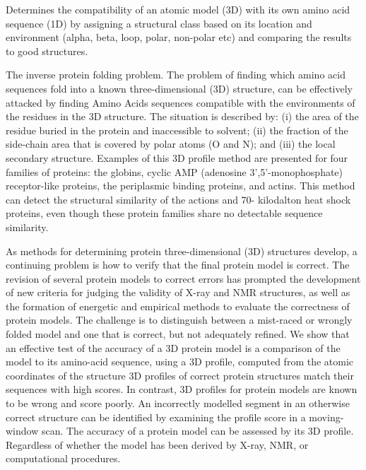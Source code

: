 \documentclass[11pt, letterpaper, english]{article}
\begin{document}
    \par{Determines the compatibility of an atomic model (3D) with its own amino acid sequence (1D) by assigning a structural class based on its location and environment (alpha, beta, loop, polar, non-polar etc) and comparing the results to good structures.}
    
    \par{The inverse protein folding problem. The problem of finding which amino acid sequences fold into a known three-dimensional (3D) structure, can be effectively attacked by finding Amino Acids sequences compatible with the environments of the residues in the 3D structure. The situation is described by: 
(i) the area of the residue buried in the protein and inaccessible to solvent; 
(ii) the fraction of the side-chain area that is covered by polar atoms (O and N); and 
(iii) the local secondary structure. 
Examples of this 3D profile method are presented for four families of proteins: the globins, cyclic AMP (adenosine 3',5'-monophosphate) receptor-like proteins, the periplasmic binding proteins, and actins. This method can detect the structural similarity of the actions and 70- kilodalton heat shock proteins, even though these protein families share no detectable sequence similarity.}

    \par{As methods for determining protein three-dimensional (3D) structures develop, a continuing problem is how to verify that the final protein model is correct. The revision of several protein models to correct errors has prompted the development of new criteria for judging the validity of X-ray and NMR structures, as well as the formation of energetic and empirical methods to evaluate the correctness of protein models. The challenge is to distinguish between a mist-raced or wrongly folded model and one that is correct, but not adequately refined. We show that an effective test of the accuracy of a 3D protein model is a comparison of the model to its amino-acid sequence, using a 3D profile, computed from the atomic coordinates of the structure 3D profiles of correct protein structures match their sequences with high scores. In contrast, 3D profiles for protein models are known to be wrong and score poorly. An incorrectly modelled segment in an otherwise correct structure can be identified by examining the profile score in a moving-window scan. The accuracy of a protein model can be assessed by its 3D profile. Regardless of whether the model has been derived by X-ray, NMR, or computational procedures.}
\end{document}
